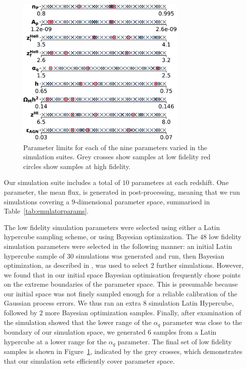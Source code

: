 \documentclass[a4paper,11pt]{article}
\begin{document}
\begin{figure}
    \centering
    \includegraphics[width=0.75\textwidth]{figures/sample_params.pdf}
    \caption{\label{fig:samples}
    Parameter limits for each of the nine parameters varied in the simulation suites.
    Grey crosses show samples at low fidelity  red circles show samples at high fidelity.
    }
\end{figure}


Our simulation suite includes a total of $10$ parameters at each redshift. One parameter, the mean flux, is generated in post-processing, meaning that we run simulations covering a $9$-dimensional parameter space, summarised in Table~\ref{tab:emulatorparams}.

The low fidelity simulation parameters were selected using either a Latin hypercube sampling scheme, or using Bayesian optimization.
The $48$ low fidelity simulation parameters were selected in the following manner: an initial Latin hypercube sample of $30$ simulations was generated and run, then Bayesian optimization, as described in \cite{Rogers:2019}, was used to select $2$ further simulations.
However, we found that in our initial space Bayesian optimisation frequently chose points on the extreme boundaries of the parameter space. This is presumable because our initial space was not finely sampled enough for a reliable calibration of the Gaussian process errors. We thus ran an extra $8$ simulation Latin Hypercube, followed by $2$ more Bayesian optimization samples. Finally, after examination of the simulation showed that the lower range of the $\alpha_q$ parameter was close to the boundary of our simulation space, we generated $6$ samples from a Latin hypercube at a lower range for the $\alpha_q$ parameter.
The final set of low fidelity samples is shown in Figure~\ref{fig:samples}, indicated by the grey crosses, which demonstrates that our simulation sets efficiently cover parameter space.
\end{document}
